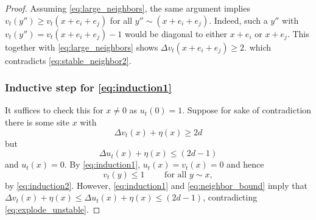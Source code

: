 \documentclass[aap]{imsart}
\begin{document}
\begin{proof}
	
	Assuming \eqref{eq:large_neighbors}, the same argument implies $v_t(y'') \geq v_t(x+e_i+e_j)$ for all $y'' \sim (x+e_i+e_j)$.
	Indeed, such a $y''$ with $v_t(y'') = v_t(x + e_i + e_j) - 1$ would be diagonal 
	to either $x + e_i$ or $x + e_j$. 
	This together with \eqref{eq:large_neighbors} shows $\Delta v_t(x + e_i + e_j) \geq 2$. 
	which contradicts \eqref{eq:stable_neighbor2}.
	
	
	
	
	\subsubsection*{Inductive step for \eqref{eq:induction1}}
	It suffices to check this for $x \not = 0$ as $u_t(0) = 1$. 
	Suppose for sake of contradiction there is some site $x$ with 
	\begin{equation} \label{eq:explode_unstable}
	\Delta v_t(x) + \eta(x) \geq 2 d
	\end{equation}
	but
	\begin{equation} \label{eq:wave_stable}
	\Delta u_t(x) + \eta(x) \leq (2 d -1)
	\end{equation}
	and $u_t(x) = 0$. By \eqref{eq:induction1}, $u_t(x) = v_t(x) = 0$ and hence 
	\begin{equation} \label{eq:neighbor_bound}
	v_t(y) \leq 1 \qquad \mbox{ for all $y \sim x$},
	\end{equation}
	by \eqref{eq:induction2}. However, \eqref{eq:induction1} and \eqref{eq:neighbor_bound} imply that
	$\Delta v_t(x) + \eta(x) \leq \Delta u_t(x) + \eta(x) \leq (2 d -1)$, contradicting \eqref{eq:explode_unstable}. 
	
	
	
	
	
	

\end{proof}
\end{document}
